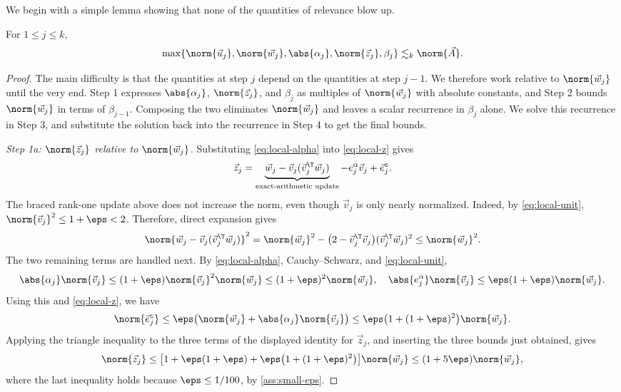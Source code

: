 We begin with a simple lemma showing that none of the quantities of relevance blow up.

\begin{lemma}
\label{lem:coefficients}
For \(1\le j\le k\),
\[
 \max\{\norm{\vec u_j},\norm{\vec w_j},\abs{\alpha_j},
          \norm{\vec z_j},\beta_j\}
 \lesssim_k\norm{\vec A}.
\]
\end{lemma}

\begin{proof}
The main difficulty is that the quantities at step $j$ depend on the quantities at step $j-1$.
We therefore work relative to \(\norm{\vec w_j}\) until the very end.
Step 1 expresses \(\abs{\alpha_j}\), \(\norm{\vec z_j}\), and \(\beta_j\) as multiples of \(\norm{\vec w_j}\) with absolute constants, and Step 2 bounds \(\norm{\vec w_j}\) in terms of \(\beta_{j-1}\).
Composing the two eliminates \(\norm{\vec w_j}\) and leaves a scalar recurrence in \(\beta_j\) alone. We solve this recurrence in Step 3, and substitute the solution back into the recurrence in Step 4 to get the final bounds.

\emph{Step 1a: \(\norm{\vec z_j}\) relative to \(\norm{\vec w_j}\).}
Substituting \cref{eq:local-alpha} into \cref{eq:local-z} gives
\[
 \vec z_j=
 \underbrace{\vec w_j-\vec v_j(\vec v_j^\T\vec w_j)}_
             {\text{exact-arithmetic update}}
 -e_j^\alpha\vec v_j+\vec e_j^z.
\]
The braced rank-one update above does not increase the norm, even though \(\vec v_j\) is only nearly normalized.
Indeed, by \cref{eq:local-unit}, \(\norm{\vec v_j}^2\le1+\eps<2\).
Therefore, direct expansion gives
\[
 \norm{\vec w_j-\vec v_j(\vec v_j^\T\vec w_j)}^2
 =\norm{\vec w_j}^2
  -\bigl(2-\vec v_j^\T\vec v_j\bigr)
   (\vec v_j^\T\vec w_j)^2
 \le\norm{\vec w_j}^2.
\]
The two remaining terms are handled next.
By \cref{eq:local-alpha}, Cauchy--Schwarz, and \cref{eq:local-unit},
\[
 \abs{\alpha_j}\norm{\vec v_j}
 \le(1+\eps)\norm{\vec v_j}^2\norm{\vec w_j}
 \le(1+\eps)^2\norm{\vec w_j},
 \quad
 \abs{e_j^\alpha}\norm{\vec v_j}
 \le\eps(1+\eps)\norm{\vec w_j}.
\]
Using this and \cref{eq:local-z}, we have
\[
 \norm{\vec e_j^z}
 \le\eps\bigl(\norm{\vec w_j}+\abs{\alpha_j}\norm{\vec v_j}\bigr)
 \le\eps\bigl(1+(1+\eps)^2\bigr)\norm{\vec w_j}.
\]
Applying the triangle inequality to the three terms of the displayed identity for \(\vec z_j\), and inserting the three bounds just obtained, gives
\[
 \norm{\vec z_j}
 \le\bigl[1+\eps(1+\eps)
              +\eps\bigl(1+(1+\eps)^2\bigr)\bigr]\norm{\vec w_j}
 \le(1+5\eps)\norm{\vec w_j},
\]
where the last inequality holds because \(\eps\le1/100\), by \cref{ass:small-eps}.


\end{proof}
